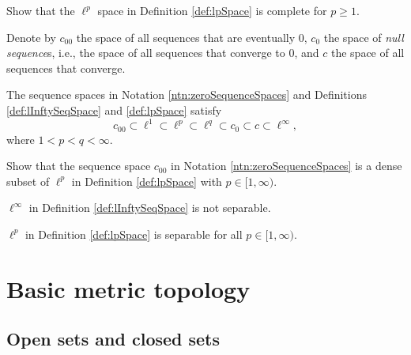 \begin{exc}
  \label{exc:ellPisComplete}
  Show that the $\ell^p$ space in Definition \ref{def:lpSpace}
  is complete for $p\ge 1$.
\end{exc}

\begin{ntn}
  \label{ntn:zeroSequenceSpaces}
  Denote by $c_{00}$ the space of all sequences
  that are eventually 0,
  $c_0$ the space of \emph{null sequence}s,
  i.e., the space of all sequences that converge to 0,
  and $c$ the space of all sequences that converge.
\end{ntn}

\begin{lem}
  \label{lem:filtrationOfSequenceSpaces}
  The sequence spaces in Notation \ref{ntn:zeroSequenceSpaces}
  and Definitions \ref{def:lInftySeqSpace} and \ref{def:lpSpace}
  satisfy
  \begin{equation}
    \label{eq:filtrationOfSequenceSpaces}
    c_{00} \subset \ell^1 \subset \ell^p  \subset \ell^q  
     \subset c_0 \subset c \subset \ell^{\infty},
  \end{equation}
  where $1<p<q<\infty$. 
\end{lem}

\begin{exc}
  \label{exc:c00isDenseInEll2}
  Show that the sequence space $c_{00}$
  in Notation \ref{ntn:zeroSequenceSpaces}
  is a dense subset of $\ell^p$
  in Definition \ref{def:lpSpace} with $p\in[1,\infty)$. 
\end{exc}

\begin{lem}
  \label{lem:ellInftyisNotSeparable}
  $\ell^{\infty}$ in Definition \ref{def:lInftySeqSpace} is not separable.
\end{lem}

\begin{lem}
  \label{lem:ellPisSeparable}
  $\ell^p$ in Definition \ref{def:lpSpace} 
  is separable for all $p\in[1,\infty)$.
\end{lem}


\section{Basic metric topology}
\label{sec:metric-topology}


\subsection{Open sets and closed sets}
\label{sec:open-sets-closed}

